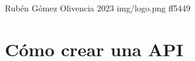 \documentclass{\ClassPath/yukibook}
\begin{document}
    {Rubén Gómez Olivencia}  %
    {2023}    %
    {} %
    {} %
    {} %
    {img/logo.png} %
    {ff5449}
    {} %

    \coverpage
    \graphicspath{{../../yukibook.cls/}}
    \licensepage
    \tableofcontents

    \graphicspath{{img/}}

%    
%    
%
%    
%    
%
%    
%
%    
%
%    
%
%    
%
%    

    \part{Cómo crear una API}
    
\end{document}
